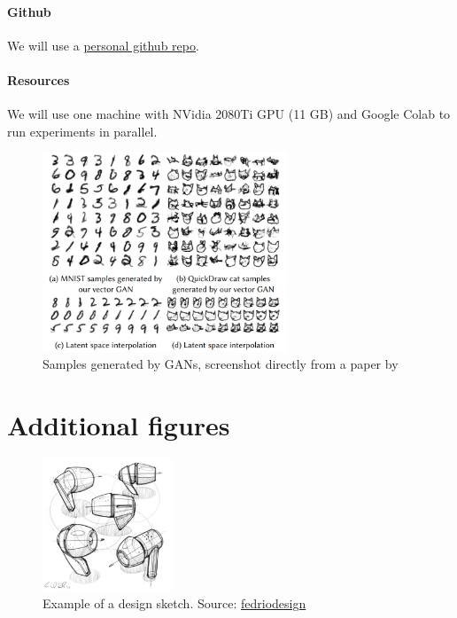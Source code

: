 \documentclass{article}
\begin{document}
\paragraph{Github} We will use a \href{https://github.com/ivanpuhachov/ift6756}{personal github repo}.

\paragraph{Resources} We will use one machine with NVidia 2080Ti GPU (11 GB) and Google Colab to run experiments in parallel.




\begin{figure}[h]
	\centering
	\includegraphics[width=0.65\textwidth]{img/diffsvg.png}
	\caption{Samples generated by GANs, screenshot directly from a paper by \cite{diffsvg}}
	\label{fig:diffsvg}
\end{figure}

\appendix 
\section{Additional figures}
\begin{figure}[h]
	\centering
	\includegraphics[width=0.35\textwidth]{img/sketch.jpeg}
	\caption{Example of a design sketch. Source: \href{https://fedriosdesign.com/design-sketching}{fedriodesign}}
	\label{fig:designsketch}
\end{figure}
\end{document}
